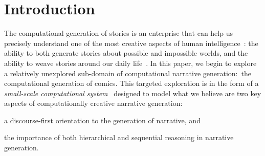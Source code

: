 \section{Introduction}

The computational generation of stories is an enterprise that can help us
precisely understand one of the most creative aspects of human
intelligence~\cite{boyd2009origin}: the ability to both generate stories about
possible and impossible worlds, and the ability to weave stories around our
daily life~\cite{herman2013storytelling}. In this paper, we begin to explore a
relatively unexplored sub-domain of computational narrative generation:~the
computational generation of comics. This targeted exploration is in the form of
a \emph{small-scale computational system}~\cite{montfort2012small} designed to
model what we believe are two key aspects of computationally creative narrative
generation:
%
\begin{inparaenum}[]
	\item a discourse-first orientation to the generation of narrative, and
	\item the importance of both hierarchical and sequential reasoning in 
		narrative generation.
\end{inparaenum}
%




